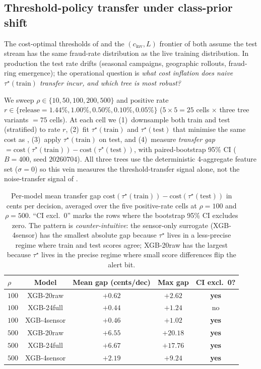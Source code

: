 \subsection{Threshold-policy transfer under class-prior shift}
\label{sec:p8-threshold-transfer}

The cost-optimal thresholds of  and the
$(c_\text{inv}, L)$ frontier of  both assume the
test stream has the same fraud-rate distribution as the live training
distribution. In production the test rate drifts (seasonal campaigns,
geographic rollouts, fraud-ring emergence); the operational question is
\emph{what cost inflation does naive $\tau^\star(\mathrm{train})$ transfer incur, and
which tree is most robust?}

We sweep $\rho \in \{10, 50, 100, 200, 500\}$ and positive rate
$r \in \{\text{release}{=}1.44\%, 1.00\%, 0.50\%, 0.10\%, 0.05\%\}$
($5 \times 5 = 25$ cells $\times$ three tree variants $= 75$ cells). At each
cell we (1)~downsample both train and test (stratified) to rate $r$,
(2)~fit $\tau^\star(\text{train})$ and $\tau^\star(\text{test})$ that minimise
the same cost as , (3)~apply
$\tau^\star(\text{train})$ on test, and (4)~measure
\emph{transfer gap} $= \text{cost}(\tau^\star(\text{train})) -
\text{cost}(\tau^\star(\text{test}))$, with paired-bootstrap 95\% CI
($B{=}400$, seed $20260704$). All three trees use the deterministic
4-aggregate feature set ($\sigma{=}0$) so this vein measures the
threshold-transfer signal alone, not the noise-transfer signal of
.

\begin{table}[t]
\centering\small
\caption{Per-model mean transfer gap $\text{cost}(\tau^\star(\text{train}))
- \text{cost}(\tau^\star(\text{test}))$ in cents per decision, averaged over
the five positive-rate cells at $\rho{=}100$ and $\rho{=}500$.
``CI excl.\ 0'' marks the rows where the bootstrap 95\% CI excludes
zero. The pattern is \emph{counter-intuitive}: the sensor-only
surrogate (XGB-4sensor) has the smallest absolute gap because
$\tau^\star$ lives in a less-precise regime where train and test scores
agree; XGB-20raw has the largest because $\tau^\star$ lives in the
precise regime where small score differences flip the alert bit.}
\label{tab:p8-threshold-transfer}
\begin{tabular}{lcccc}
\toprule
$\rho$ & Model & Mean gap (cents/dec) & Max gap & CI excl.\ 0? \\
\midrule
$100$ & XGB-20raw   & $+0.62$ & $+2.62$ & \textbf{yes} \\
$100$ & XGB-24full  & $+0.44$ & $+1.24$ & no \\
$100$ & XGB-4sensor & $+0.46$ & $+1.02$ & \textbf{yes} \\
\midrule
$500$ & XGB-20raw   & $+6.55$ & $+20.18$ & \textbf{yes} \\
$500$ & XGB-24full  & $+6.67$ & $+17.76$ & \textbf{yes} \\
$500$ & XGB-4sensor & $+2.19$ & $+9.24$  & \textbf{yes} \\
\bottomrule
\end{tabular}
\end{table}

